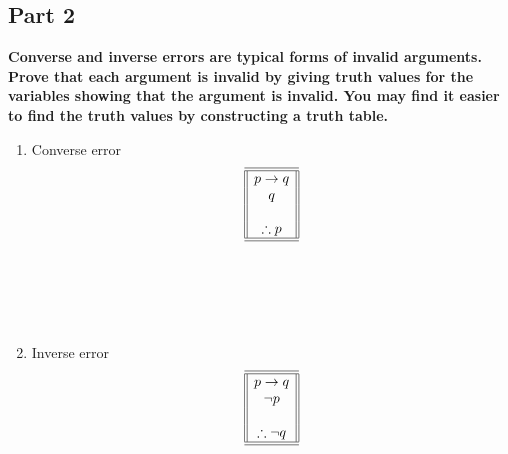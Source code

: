 \documentclass{amsart}
\theoremstyle{definition}
\theoremstyle{Exercise}
\theoremstyle{remark}
\theoremstyle{rule}
\numberwithin{equation}{section}
\begin{document}
\subsection*{Part 2}
{\bf Converse and inverse errors are typical forms of invalid arguments. Prove that each argument is invalid by giving truth values for the variables showing that the argument is invalid. You may find it easier to find the truth values by constructing a truth table.}\\
 \begin{enumerate}[label=(\alph*)]
\item Converse error
\[
\begin{array}{||c||}
\hline \hline
p \to q\\
q\\
\\
\therefore p\\
\hline \hline
\end{array}
\]\\\\
 \\\\
\item Inverse error
\[
\begin{array}{||c||}
\hline \hline
p \to q\\
\neg p\\
\\
\therefore \neg q\\
\hline \hline
\end{array}
\]\\\\
\\\\
\end{enumerate}
\end{document}
